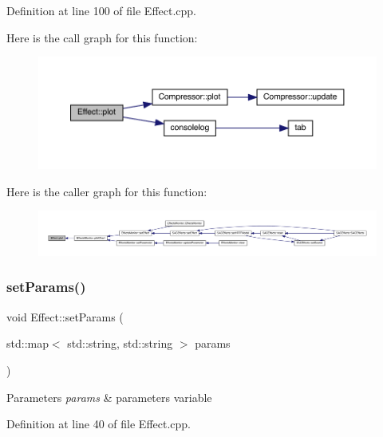 Definition at line 100 of file Effect.\+cpp.

Here is the call graph for this function\+:
\nopagebreak
\begin{figure}[H]
\begin{center}
\leavevmode
\includegraphics[width=350pt]{class_effect_ac2c35ce7382d627f20879b44be0e8132_cgraph}
\end{center}
\end{figure}
Here is the caller graph for this function\+:
\nopagebreak
\begin{figure}[H]
\begin{center}
\leavevmode
\includegraphics[width=350pt]{class_effect_ac2c35ce7382d627f20879b44be0e8132_icgraph}
\end{center}
\end{figure}
\mbox{\label{class_effect_af0094495d423173463fd3e9cd40789af}} 
\subsubsection{\texorpdfstring{set\+Params()}{setParams()}}
{\footnotesize\ttfamily void Effect\+::set\+Params (\begin{DoxyParamCaption}\item[{std\+::map$<$ std\+::string, std\+::string $>$}]{params }\end{DoxyParamCaption})}


\begin{DoxyParams}{Parameters}
{\em params} & parameters variable \\
\hline
\end{DoxyParams}


Definition at line 40 of file Effect.\+cpp.

